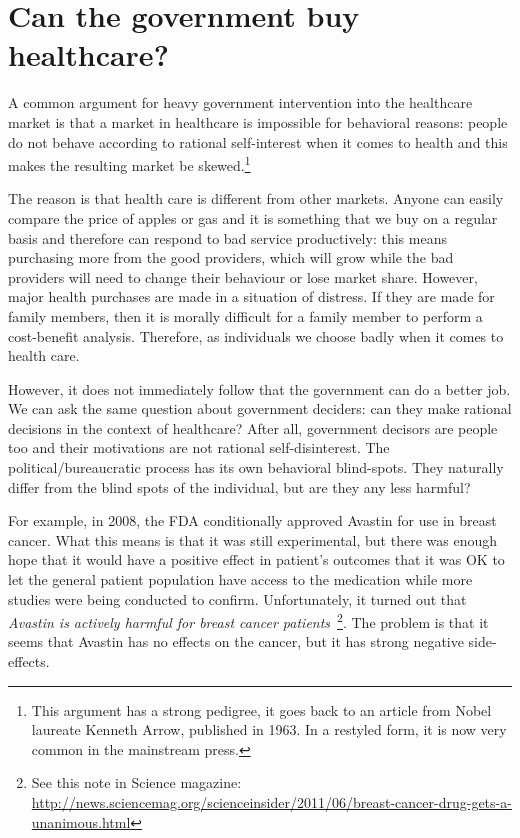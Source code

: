 \section{Can the government buy healthcare?}

A common argument for heavy government intervention into the healthcare market
is that a market in healthcare is impossible for behavioral reasons: people do
not behave according to rational self-interest when it comes to health and this
makes the resulting market be skewed.\footnote{This argument has a strong
pedigree, it goes back to an article from Nobel laureate Kenneth Arrow,
published in 1963. In a restyled form, it is now very common in the mainstream
press.}

The reason is that health care is different from other markets. Anyone
can easily compare the price of apples or gas and it is something that we buy
on a regular basis and therefore can respond to bad service productively: this
means purchasing more from the good providers, which will grow while the bad
providers will need to change their behaviour or lose market share. However,
major health purchases are made in a situation of distress.  If they are made
for family members, then it is morally difficult for a family member to perform
a cost-benefit analysis. Therefore, as individuals we choose badly when it
comes to health care.

However, it does not immediately follow that the government can do a better
job. We can ask the same question about government deciders: can they make
rational decisions in the context of healthcare? After all, government decisors
are people too and their motivations are not rational self-disinterest. The
political/bureaucratic process has its own behavioral blind-spots. They
naturally differ from the blind spots of the individual, but are they any less
harmful?

For example, in 2008, the FDA conditionally approved Avastin for use in breast
cancer. What this means is that it was still experimental, but there was enough
hope that it would have a positive effect in patient's outcomes that it was OK
to let the general patient population have access to the medication while more
studies were being conducted to confirm. Unfortunately, it turned out that
\emph{Avastin is actively harmful for breast cancer
patients}~\cite{avastin-harfmul}\footnote{See this note in Science magazine:
\url{http://news.sciencemag.org/scienceinsider/2011/06/breast-cancer-drug-gets-a-unanimous.html}}.
The problem is that it seems that Avastin has no effects on the cancer, but it
has strong negative side-effects.

